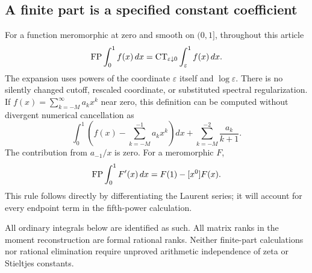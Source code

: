 \subsection{A finite part is a specified constant coefficient}

For a function meromorphic at zero and smooth on $(0,1]$, throughout
this article
\begin{equation}\label{eq:fpdef}
 \operatorname{FP}\int_0^1f(x)\,dx
 =\operatorname{CT}_{\varepsilon\downarrow0}\int_\varepsilon^1f(x)\,dx.
\end{equation}
The expansion uses powers of the coordinate $\varepsilon$ itself and
$\log\varepsilon$. There is no silently changed cutoff, rescaled
coordinate, or substituted spectral regularization. If
$f(x)=\sum_{k=-M}^{\infty}a_kx^k$ near zero, this definition can be
computed without divergent numerical cancellation as
\begin{equation}\label{eq:fpsubtraction}
 \int_0^1\left(f(x)-\sum_{k=-M}^{-1}a_kx^k\right)dx
       +\sum_{k=-M}^{-2}\frac{a_k}{k+1}.
\end{equation}
The contribution from $a_{-1}/x$ is zero. For a meromorphic $F$,
\begin{equation}\label{eq:fpderivative}
 \operatorname{FP}\int_0^1F'(x)\,dx=F(1)-[x^0]F(x).
\end{equation}
This rule follows directly by differentiating the Laurent series; it
will account for every endpoint term in the fifth-power calculation.

All ordinary integrals below are identified as such. All matrix ranks
in the moment reconstruction are formal rational ranks. Neither
finite-part calculations nor rational elimination require unproved
arithmetic independence of zeta or Stieltjes constants.
